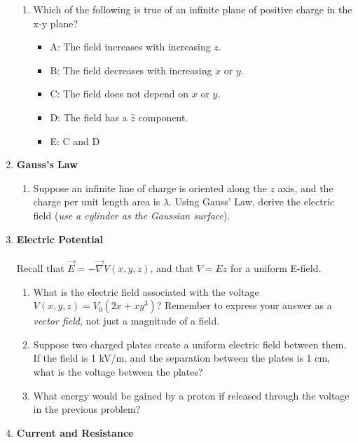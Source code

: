 \documentclass[10pt]{article}
\begin{document}
\begin{enumerate}
\begin{enumerate}
\item Which of the following is true of an infinite plane of positive charge in the x-y plane?
\begin{itemize}
\item A: The field increases with increasing $z$.
\item B: The field decreases with increasing $x$ or $y$.
\item C: The field does not depend on $x$ or $y$.
\item D: The field has a $\hat{z}$ component.
\item E: C and D
\end{itemize}
\end{enumerate}
\item \textbf{Gauss's Law}
\begin{enumerate}
\item Suppose an infinite line of charge is oriented along the $z$ axis, and the charge per unit length area is $\lambda$.  Using Gauss' Law, derive the electric field (\textit{use a cylinder as the Gaussian surface}). \\ \vspace{2.5cm}
\end{enumerate}
\item \textbf{Electric Potential}
\\ \\ Recall that $\vec{E} = -\vec{\nabla} V(x,y,z)$, and that $V = E z$ for a uniform E-field.
\begin{enumerate}
\item What is the electric field associated with the voltage $V(x,y,z) = V_0 \left( 2x + xy^3 \right)$?  Remember to express your answer as a \textit{vector field}, not just a magnitude of a field.  \\ \vspace{1.5cm}
\item Suppose two charged plates create a uniform electric field between them.  If the field is 1 kV/m, and the separation between the plates is 1 cm, what is the voltage between the plates?  \\ \vspace{1.5cm}
\item What energy would be gained by a proton if released through the voltage in the previous problem? \\ \vspace{1.5cm}
\end{enumerate}
\item \textbf{Current and Resistance}

\end{enumerate}
\end{document}
